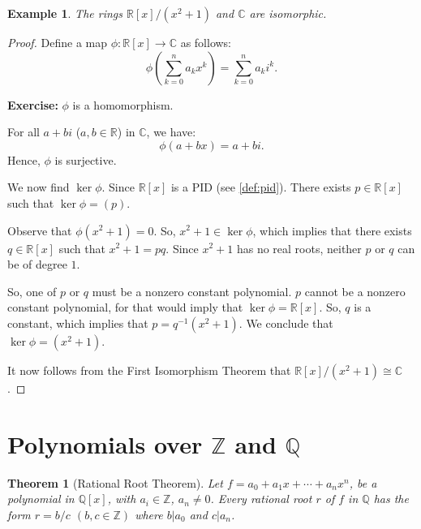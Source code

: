 \documentclass[a4paper,12pt]{report}
\newcommand{\ra}{\longrightarrow}
\newcounter{statement}
\numberwithin{statement}{chapter}
\newtheorem{thm}[statement]{Theorem}
\newtheorem{eg}[statement]{\bf Example}
\numberwithin{equation}{chapter}
\numberwithin{section}{chapter}
\numberwithin{subsection}{section}
\begin{document}
\begin{eg}
The rings $\mathbb{R}[x]/(x^2 + 1)$ and $\mathbb{C}$ are isomorphic.
\end{eg}
\begin{proof}

Define a map $\phi : \mathbb{R}[x] \ra \mathbb{C}$ as follows:
\[
\phi(\sum_{k = 0}^na_kx^k) = \sum_{k = 0}^n a_k i^k.
\]




 {\bf Exercise:}  $\phi$ is a homomorphism.





For all $a + bi$ ($a, b \in \mathbb{R}$) in $\mathbb{C}$, we have:
\[
\phi(a + bx) = a + bi.
\]
Hence, $\phi$ is surjective.





We now find $\ker \phi$.
Since $\mathbb{R}[x]$ is a PID (see \cref{def:pid}).  There exists $p \in \mathbb{R}[x]$
such that $\ker \phi = (p)$.





Observe that $\phi(x^2 + 1) = 0$.  So, $x^2 + 1 \in \ker \phi$,
which implies that there exists $q \in \mathbb{R}[x]$ such that $x^2 + 1 = pq$.
Since $x^2 + 1$ has no real roots, neither $p$ or $q$ can be of degree $1$.





So, one of $p$ or $q$ must be a nonzero constant polynomial.
$p$ cannot be a nonzero constant polynomial, for that would imply that
$\ker \phi = \mathbb{R}[x]$.  So, $q$ is a constant,
which implies that $p = q^{-1} (x^2 + 1)$.  We conclude that $\ker \phi = (x^2 + 1)$.





It now follows from the First Isomorphism Theorem that
$\mathbb{R}[x]/(x^2 + 1)\cong \mathbb{C}$.


\end{proof}




\section{Polynomials over $\mathbb{Z}$ and $\mathbb{Q}$}

\begin{thm}[Rational Root Theorem]


Let $f = a_0 + a_1x + \cdots + a_nx^n$, be a polynomial
in $\mathbb{Q}[x]$, with $a_i \in \mathbb{Z}$, $a_n \neq 0$.
Every rational root $r$ of $f$ in $\mathbb{Q}$ has the form
$r = b/c$ $(b, c \in \mathbb{Z})$ where $b | a_0$ and $c | a_n$.
\end{thm}
\end{document}
